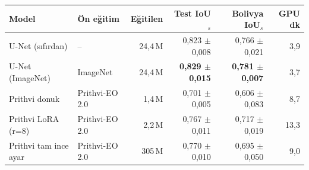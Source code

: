 \begin{tabular}{llrrrr}
\toprule
Model & Ön eğitim & Eğitilen & Test IoU$_s$ & Bolivya IoU$_s$ & GPU dk \\
\midrule
U-Net (sıfırdan) & -- & 24,4\,M & 0,823 $\pm$ 0,008 & 0,766 $\pm$ 0,021 & 3,9 \\
U-Net (ImageNet) & ImageNet & 24,4\,M & \textbf{0,829 $\pm$ 0,015} & \textbf{0,781 $\pm$ 0,007} & 3,7 \\
Prithvi donuk & Prithvi-EO 2.0 & 1,4\,M & 0,701 $\pm$ 0,005 & 0,606 $\pm$ 0,083 & 8,7 \\
Prithvi LoRA (r=8) & Prithvi-EO 2.0 & 2,2\,M & 0,767 $\pm$ 0,011 & 0,717 $\pm$ 0,019 & 13,3 \\
Prithvi tam ince ayar & Prithvi-EO 2.0 & 305\,M & 0,770 $\pm$ 0,010 & 0,695 $\pm$ 0,050 & 9,0 \\
\bottomrule
\end{tabular}
